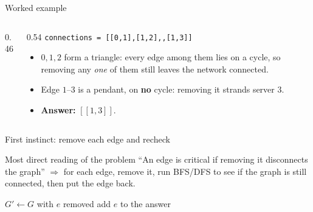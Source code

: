 \documentclass[11pt,aspectratio=169]{beamer}
\begin{document}
\begin{frame}{Worked example}
  \begin{columns}
  \begin{column}{0.46\textwidth}
  \begin{center}
  \end{center}
  \end{column}
  \begin{column}{0.54\textwidth}
  \small
  \texttt{connections = [[0,1],[1,2],\allowbreak[2,0],[1,3]]}
  \begin{itemize}
    \item $0,1,2$ form a triangle: every edge among them lies on a cycle, so removing
    any \emph{one} of them still leaves the network connected.
    \item Edge $1$--$3$ is a pendant, on \textbf{no} cycle: removing it strands server
    $3$.
    \item \textbf{Answer:} $[[1,3]]$.
  \end{itemize}
  \end{column}
  \end{columns}
\end{frame}

\begin{frame}{First instinct: remove each edge and recheck}
  \begin{block}{Most direct reading of the problem}
    ``An edge is critical if removing it disconnects the graph'' $\Rightarrow$ for each
    edge, remove it, run BFS/DFS to see if the graph is still connected, then put the
    edge back.
  \end{block}
  \begin{algorithmic}[1]
      \State $G' \gets G$ with $e$ removed
        \State add $e$ to the answer
      \EndIf
    \EndFor
  \end{algorithmic}
\end{frame}
\end{document}

